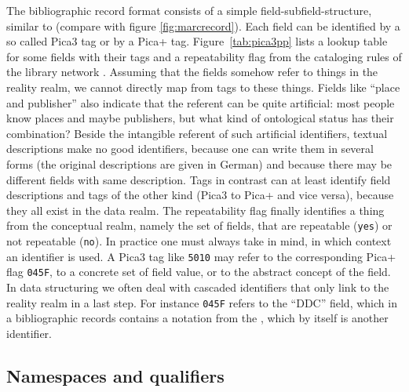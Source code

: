 The bibliographic record format  consists of a simple 
field-subfield-structure, similar to  (compare with figure 
\ref{fig:marcrecord}). Each field can be identified by a so called
Pica3 tag or by a Pica+ tag. Figure~\ref{tab:pica3pp} lists a lookup table 
for some fields with their tags and a repeatability flag from the cataloging 
rules of the  library network \cite{Pica2010}. 
Assuming that the
fields somehow refer to things in the reality realm, we cannot directly
map from tags to these things. Fields like ``place and publisher'' also
indicate that the referent can be quite artificial: most people know places
and maybe publishers, but what kind of ontological status has their 
combination? Beside the intangible referent of such artificial identifiers, 
textual descriptions make no good identifiers, because one can write them in
several forms (the original descriptions are given in German) and because 
there may be different fields with same description. Tags in contrast can 
at least identify field descriptions and tags of the other kind (Pica3 to 
Pica+ and vice versa), because they all exist in the data realm. The 
repeatability flag finally identifies a thing from the conceptual realm, 
namely the set of fields, that are repeatable (\verb|yes|) or not repeatable
(\verb|no|). In practice one must always take in mind, in which context an identifier 
is used. A Pica3 tag like \verb|5010| may refer to the corresponding
Pica+ flag \verb|045F|, to a concrete set of field value, or to the abstract
concept of the field. In data structuring we often deal with cascaded 
identifiers that only link to the reality realm in a last step. For instance 
\verb|045F| refers to the ``DDC'' field, which in a bibliographic records 
contains a notation from the ,
which by itself is another identifier. %


\subsection{Namespaces and qualifiers}
\label{sec:qualifiers}

